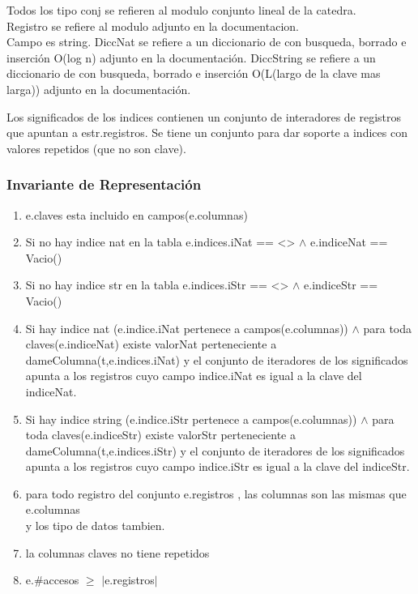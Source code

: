 Todos los tipo conj se refieren al modulo conjunto lineal de la catedra. \\
Registro se refiere al modulo adjunto en la documentacion. \\
Campo es string.
DiccNat se refiere a un diccionario de con busqueda, borrado e inserci\'on O(log n) adjunto en la documentaci\'on.
DiccString se refiere a un diccionario de con busqueda, borrado e inserci\'on O(L(largo de la clave mas larga)) adjunto en la documentaci\'on.

Los significados de los indices contienen un conjunto de interadores de registros que apuntan a estr.registros. Se tiene un conjunto para dar soporte a indices con valores repetidos (que no son clave).


\subsubsection{Invariante de Representaci\'on}

\begin{enumerate}
	\item e.claves esta incluido en campos(e.columnas)
	\item Si no hay indice nat en la tabla e.indices.iNat == <> $\land$ e.indiceNat == Vacio() 
	\item Si no hay indice str en la tabla e.indices.iStr == <> $\land$ e.indiceStr == Vacio() 
	\item Si hay indice nat (e.indice.iNat pertenece a campos(e.columnas)) $\land$ para toda claves(e.indiceNat) existe valorNat perteneciente a dameColumna(t,e.indices.iNat) y el conjunto de iteradores de los significados apunta a los registros cuyo campo indice.iNat es igual a la clave del indiceNat.
	\item Si hay indice string (e.indice.iStr pertenece a campos(e.columnas)) $\land$ para toda claves(e.indiceStr) existe valorStr perteneciente a dameColumna(t,e.indices.iStr) y el conjunto de iteradores de los significados apunta a los registros cuyo campo indice.iStr es igual a la clave del indiceStr.
	\item para todo registro del conjunto e.registros , las columnas son las mismas que e.columnas \\
			y los tipo de datos tambien.
	\item la columnas claves no tiene repetidos
	\item e.\#accesos $\geq$ $|$e.registros$|$
\end{enumerate}


